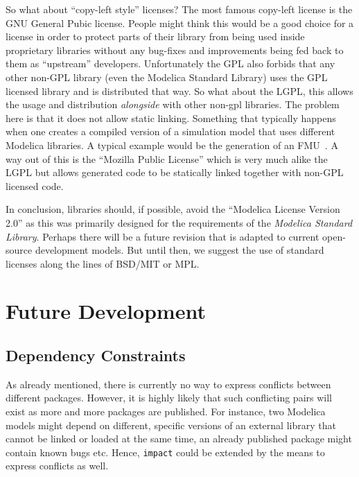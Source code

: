 \documentclass[11pt,a4paper,twocolumn]{article}
\newcommand{\code}[1]{\texttt{#1}} %
\begin{document}
So what about ``copy-left style'' licenses? The most famous copy-left
license is the GNU General Pubic license. People might think this
would be a good choice for a license in order to protect parts of
their library from being used inside proprietary libraries without any
bug-fixes and improvements being fed back to them as ``upstream''
developers. Unfortunately the GPL also forbids that any other
\mbox{non-GPL} library (even the Modelica Standard Library) uses the
GPL licensed library and is distributed that way. So what about the
LGPL, this allows the usage and distribution \emph{alongside} with
other non-gpl libraries. The problem here is that it does not allow
static linking. Something that typically happens when one creates a
compiled version of a simulation model that uses different Modelica
libraries.  A typical example would be the generation of an
FMU~\parencite{FMI}.  A way out of this is the ``Mozilla Public
License'' which is very much alike the LGPL but allows generated code
to be statically linked together with non-GPL licensed code.

In conclusion, libraries should, if possible, avoid the ``Modelica
License Version 2.0'' as this was primarily designed for the
requirements of the \emph{Modelica Standard Library}. Perhaps there
will be a future revision that is adapted to current open-source
development models. But until then, we suggest the use of standard
licenses along the lines of BSD/MIT or MPL.


\section{Future Development}

\subsection{Dependency Constraints}
As already mentioned, there is currently no way to express conflicts
between different packages.  However, it is highly likely that such
conflicting pairs will exist as more and more packages are published.
For instance, two Modelica models might depend on different, specific
versions of an external library that cannot be linked or loaded at the
same time, an already published package might contain known bugs etc.
Hence, \code{impact} could be extended by the means to express
conflicts as well.
\end{document}
